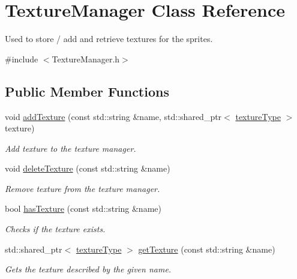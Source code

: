 \hypertarget{class_texture_manager}{\section{Texture\-Manager Class Reference}
\label{db/ddf/class_texture_manager}
}


Used to store / add and retrieve textures for the sprites.  




{\ttfamily \#include $<$Texture\-Manager.\-h$>$}

\subsection*{Public Member Functions}
\begin{DoxyCompactItemize}
\item 
void \hyperlink{class_texture_manager_a5813b701fac3e4835db3b26d9847123e}{add\-Texture} (const std\-::string \&name, std\-::shared\-\_\-ptr$<$ \hyperlink{_texture_manager_8h_a6985b069f3b16586ac115345fb9f297f}{texture\-Type} $>$ texture)
\begin{DoxyCompactList}\small\item\em Add texture to the texture manager. \end{DoxyCompactList}\item 
void \hyperlink{class_texture_manager_a850efc7a20484e2477738a2621dbb8c3}{delete\-Texture} (const std\-::string \&name)
\begin{DoxyCompactList}\small\item\em Remove texture from the texture manager. \end{DoxyCompactList}\item 
bool \hyperlink{class_texture_manager_a12fec197f62b9427b8cdd2dde7019647}{has\-Texture} (const std\-::string \&name)
\begin{DoxyCompactList}\small\item\em Checks if the texture exists. \end{DoxyCompactList}\item 
std\-::shared\-\_\-ptr$<$ \hyperlink{_texture_manager_8h_a6985b069f3b16586ac115345fb9f297f}{texture\-Type} $>$ \hyperlink{class_texture_manager_a43649a430b840bf86fd5616c404ef9ff}{get\-Texture} (const std\-::string \&name)
\begin{DoxyCompactList}\small\item\em Gets the texture described by the given name. \end{DoxyCompactList}\end{DoxyCompactItemize}
